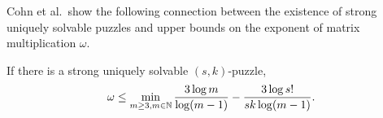 \documentclass[11pt]{article}
\begin{document}
Cohn et al.~show the following connection between the existence of
strong uniquely solvable puzzles and upper bounds on the exponent of
matrix multiplication $\omega$.
\begin{lemma}
  \label{lem:omega}
  If there is a strong uniquely solvable $(s,k)$-puzzle,
  $$\omega \le \min_{m \ge 3, m \in \mathbb{N}} \frac{3 \log
    m}{\log(m-1)} - \frac{3 \log s!}{sk \log(m-1)}.$$
\end{lemma}

\end{document}
